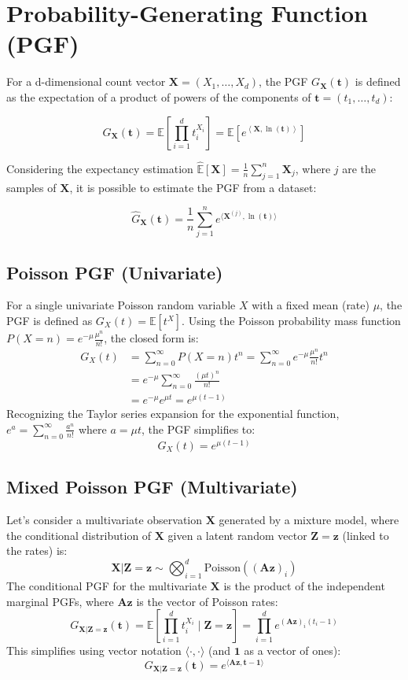 \section{Probability-Generating Function (PGF)}
For a d-dimensional count vector $\mathbf{X}=(X_1,\dots,X_d)$, the PGF $G_{\mathbf{X}}(\mathbf{t})$ is defined as the expectation of a product of powers of the components of $\mathbf{t}=(t_1,\dots,t_d)$:

$$G_{\mathbf{X}}(\mathbf{t}) = \mathbb{E}\left[\prod_{i=1}^{d} t_i^{X_i}\right] = \mathbb{E}\left[e^{\left\langle \mathbf{X}, \ln(\mathbf{t}) \right\rangle}\right]$$

Considering the expectancy estimation $\hat{\mathbb{E}}[\mathbf{X}] = \frac{1}{n} \sum_{j=1}^{n} \mathbf{X}_j$, where $j$ are the samples of $\mathbf{X}$, it is possible to estimate the PGF from a dataset:

$$\hat{G}_{\mathbf{X}}(\mathbf{t}) = \frac{1}{n} \sum_{j=1}^{n} e^{\langle \mathbf{X}^{(j)}, \ln(\mathbf{t}) \rangle}$$

\subsection*{Poisson PGF (Univariate)}

For a single univariate Poisson random variable $X$ with a fixed mean (rate) $\mu$, the PGF is defined as $G_X(t) = \mathbb{E}[t^X]$.
Using the Poisson probability mass function $P(X=n) = e^{-\mu} \frac{\mu^n}{n!}$, the closed form is:
\begin{align*}
G_X(t) &= \sum_{n=0}^{\infty} P(X=n) t^n = \sum_{n=0}^{\infty} e^{-\mu} \frac{\mu^n}{n!} t^n \\
&= e^{-\mu} \sum_{n=0}^{\infty} \frac{(\mu t)^n}{n!} \\
&= e^{-\mu} e^{\mu t} = e^{\mu(t-1)}
\end{align*}
Recognizing the Taylor series expansion for the exponential function, $e^a = \sum_{n=0}^{\infty} \frac{a^n}{n!}$ where $a = \mu t$, the PGF simplifies to:
$$
G_X(t) = e^{\mu(t-1)} \text{}
$$

\subsection*{Mixed Poisson PGF (Multivariate)}

Let's consider a multivariate observation $\mathbf{X}$ generated by a mixture model, where the conditional distribution of $\mathbf{X}$ given a latent random vector $\mathbf{Z}=\mathbf{z}$ (linked to the rates) is:
$$\mathbf{X}|\mathbf{Z}=\mathbf{z} \sim \bigotimes_{i=1}^{d} \text{Poisson}((\mathbf{A}\mathbf{z})_i)$$
The conditional PGF for the multivariate $\mathbf{X}$ is the product of the independent marginal PGFs, where $\mathbf{A}\mathbf{z}$ is the vector of Poisson rates:
$$
G_{\mathbf{X}|\mathbf{Z}=\mathbf{z}}(\mathbf{t}) = \mathbb{E}\left[\prod_{i=1}^{d} t_i^{X_i} \mid \mathbf{Z}=\mathbf{z}\right] = \prod_{i=1}^d e^{(\mathbf{A}\mathbf{z})_i (t_i - 1)}
$$
This simplifies using vector notation $\langle \cdot, \cdot \rangle$ (and $\mathbf{1}$ as a vector of ones):
$$
G_{\mathbf{X}|\mathbf{Z}=\mathbf{z}}(\mathbf{t}) = e^{\langle \mathbf{A}\mathbf{z}, \mathbf{t}-\mathbf{1}\rangle} \text{}
$$

